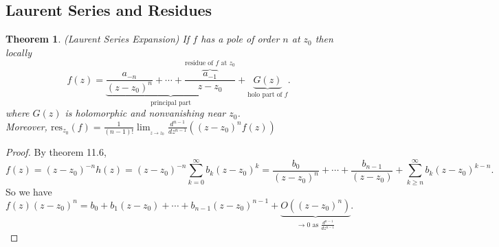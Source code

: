 \documentclass[a4paper]{article}
\newtheorem{thm}{Theorem}[section]
\begin{document}
\subsection{Laurent Series and Residues}
\begin{thm}
    (Laurent Series Expansion) If $f$ has a pole of order $n$ at $z_0$ then locally \[
    f(z)=\underbrace{\frac{a_{-n}}{(z-z_0)^n}+\cdots+\frac{\overbrace{a_{-1}}^{\text{residue of $f$ at $z_0$}}}{z-z_0}}_{\text{principal part}}+\underbrace{G(z)}_{ \text{holo part of }f}
    .\]  where $G(z)$ is holomorphic and nonvanishing near $z_0$.\\
    Moreover, $ \text{res}_{z_0}(f)=\frac{1}{(n-1)!}\lim_{_{z\to z_0}} \frac{d^{n-1}}{dz^{n-1}}((z-z_0)^nf(z))$
\end{thm}
\begin{proof}
    By theorem 11.6, \[
        f(z)=(z-z_0)^{-n}h(z)=(z-z_0)^{-n}\sum_{k=0}^\infty b_k(z-z_0)^k=\frac{b_0}{(z-z_0)^n}+\cdots+\frac{b_{n-1}}{(z-z_0)}+\sum_{k\geq n}^\infty b_{k}(z-z_0)^{k-n}
    .\] 
    So we have \[
    f(z)(z-z_0)^n=b_0+b_1(z-z_0)+\cdots + b_{n-1}(z-z_0)^{n-1}+\underbrace{O((z-z_0)^n)}_{\to 0 \text{ as } \frac{d^{n-1}}{dz^{n-1}}}
    .\] 
\end{proof}
\end{document}
